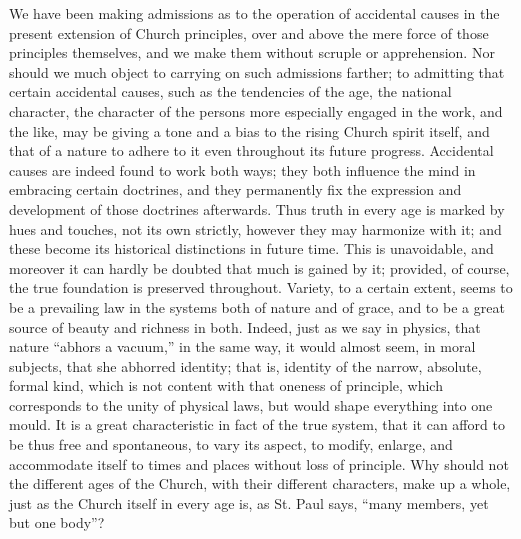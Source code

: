 We have been making admissions as to the
operation of accidental causes in the present extension of Church
principles, over and above the mere force of those principles
themselves, and we make them without scruple or apprehension. Nor
should we much object to carrying on such admissions farther; to
admitting that certain accidental causes, such as the tendencies of
the age, the national character, the character of the persons more
especially engaged in the work, and the like, may be giving a tone and
a bias to the rising Church spirit itself, and that of a nature to
adhere to it even throughout its future progress. Accidental causes
are indeed found to work both ways; they both influence the mind in
embracing certain doctrines, and they permanently fix the expression
and development of those doctrines afterwards. Thus truth in every age
is marked by hues and touches, not its own strictly, however they may
harmonize with it; and these become its historical distinctions in
future time. This is unavoidable, and moreover it can hardly be
doubted that much is gained by it; provided, of course, the true
foundation is preserved throughout. Variety, to a certain extent,
seems to be a prevailing law in the systems both of nature and of
grace, and to be a great source of beauty and richness in both.
Indeed, just as we say in physics, that nature ``abhors a vacuum,'' in
the same way, it would almost seem, in moral subjects, that she
abhorred identity; that is, identity of the narrow, absolute, formal
kind, which is not content with that oneness of principle, which
corresponds to the unity of physical laws, but would shape everything
into one mould. It is a great characteristic in fact of the true
system, that it can afford to be thus free and spontaneous, to vary
its aspect, to modify, enlarge, and accommodate itself to times and
places without loss of principle. Why should not the different ages of
the Church, with their different characters, make up a whole, just as
the Church itself in every age is, as St. Paul says, ``many members,
yet but one body''?

